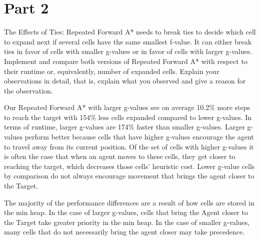 \documentclass[12pt]{article}
\begin{document}
\section*{Part 2}
 \begin{itshape}
 The Effects of Ties: Repeated Forward A* needs to break ties to decide which cell to expand next if several cells have the same smallest f-value. It can either break ties in favor of cells with smaller g-values or in favor of cells with larger g-values. Implement and compare both versions of Repeated Forward A* with respect to their runtime or, equivalently, number of expanded cells. Explain your observations in detail, that is, explain what you observed and give a
reason for the observation.
 \end{itshape}
\begin {flushleft}
Our Repeated Forward A* with larger g-values see on average 10.2\% more steps to reach the target with 154\% less cells expanded compared to lower g-values. In terms of runtime, larger g-values are 174\% faster than smaller g-values. 
Larger g-values perform better because cells that have higher g-values encourage the agent to travel away from its current position. Of the set of cells with higher g-values it is often the case that when an agent moves to these cells, they get closer to reaching the target, which decreases those cells’ heuristic cost. Lower g-value cells by comparison do not always encourage movement that brings the agent closer to the Target. 

The majority of the performance differences are a result of how cells are stored in the min heap.
In the case of larger g-values, cells that bring the Agent closer to the Target take greater priority in the min heap. In the case of smaller g-values, many cells that do not necessarily bring the agent closer may take precedence. 

\end{flushleft}
\end{document}
